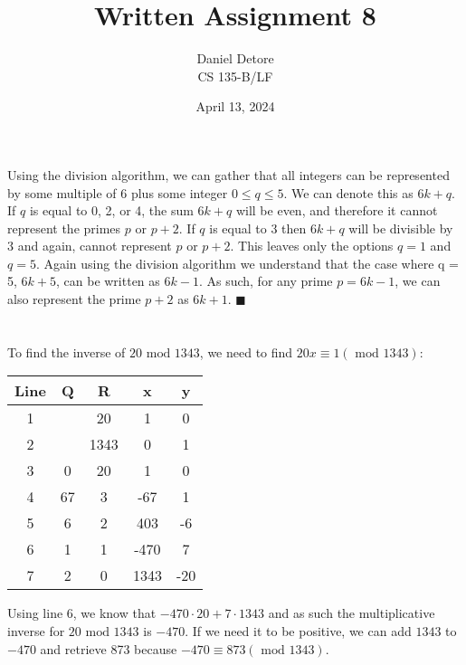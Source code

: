 \documentclass{article}
\title{Written Assignment 8}
\author{Daniel Detore\\CS 135-B/LF}
\date{April 13, 2024}
\renewcommand{\mod}{\text{ mod }}
\begin{document}
\maketitle
\raggedright

\section{}
Using the division algorithm, we can gather that all integers can be represented by some multiple of 6 plus some integer $0 \leq q \leq 5$. We can denote this as $6k + q$. If $q$ is equal to 0, 2, or 4, the sum $6k + q$ will be even, and therefore it cannot represent the primes $p$ or $p+2$. If $q$ is equal to 3 then $6k + q$ will be divisible by 3 and again, cannot represent $p$ or $p+2$. This leaves only the options $q = 1$ and $q = 5$. Again using the division algorithm we understand that the case where q = 5, $6k + 5$, can be written as $6k - 1$. As such, for any prime $p = 6k-1$, we can also represent the prime $p+2$ as $6k+1$. $\blacksquare$


\section{}
\subsection{}
To find the inverse of $20 \mod 1343$, we need to find $20x \equiv 1 (\mod 1343)$:
\begin{table}[hbt!]
    \begin{tabular}{c|cccc}
    Line & Q  & R    & x    & y   \\ \hline
    1    &    & 20   & 1    & 0   \\
    2    &    & 1343 & 0    & 1   \\
    3    & 0  & 20   & 1    & 0   \\
    4    & 67 & 3    & -67  & 1   \\
    5    & 6  & 2    & 403  & -6  \\
    6    & 1  & 1    & -470 & 7   \\
    7    & 2  & 0    & 1343 & -20
    \end{tabular}
\end{table}

Using line 6, we know that $-470 \cdot 20 + 7 \cdot 1343 $ and as such the multiplicative inverse for $20 \mod 1343$ is $-470$. If we need it to be positive, we can add $1343$ to $-470$ and retrieve 873 because $-470 \equiv 873 (\mod 1343)$.
\end{document}
